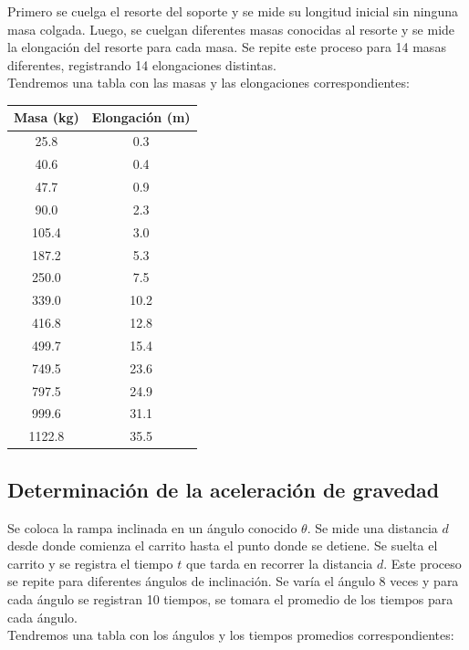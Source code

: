 \documentclass{article}
\begin{document}
\begin{multicols}{2}
    Primero se cuelga el resorte del soporte y se mide su longitud inicial sin ninguna masa colgada.
    Luego, se cuelgan diferentes masas conocidas al resorte y se mide la elongación del resorte 
    para cada masa. Se repite este proceso para 14 masas diferentes, registrando 14 elongaciones distintas.
    \\ Tendremos una tabla con las masas y las elongaciones correspondientes:
    \begin{center}
        \begin{tabular}{|c|c|}
            \hline
            Masa (kg) & Elongación (m) \\
            \hline
            25.8 & 0.3 \\
            40.6 & 0.4 \\
            47.7 & 0.9 \\
            90.0 & 2.3 \\
            105.4 & 3.0 \\
            187.2 & 5.3 \\
            250.0 & 7.5 \\
            339.0 & 10.2 \\
            416.8 & 12.8 \\
            499.7 & 15.4 \\
            749.5 & 23.6 \\
            797.5 & 24.9 \\
            999.6 & 31.1 \\
            1122.8 & 35.5 \\
            \hline
        \end{tabular}
    \end{center}
\subsection{Determinación de la aceleración de gravedad}

    Se coloca la rampa inclinada en un ángulo conocido $\theta$. Se mide una distancia $d$ desde
    donde comienza el carrito hasta el punto donde se detiene. Se suelta el carrito y se registra
    el tiempo $t$ que tarda en recorrer la distancia $d$. Este proceso se repite para diferentes
    ángulos de inclinación. Se varía el ángulo 8 veces y para cada ángulo se registran 10 tiempos,
    se tomara el promedio de los tiempos para cada ángulo.
    \\ Tendremos una tabla con los ángulos y los tiempos promedios correspondientes:


\end{multicols}
\end{document}
